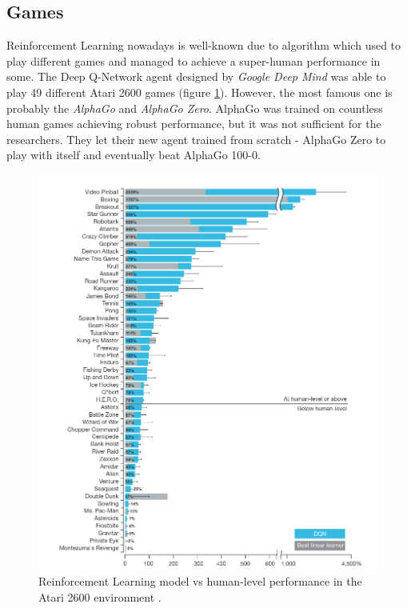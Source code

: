 \subsection{Games}
\label{sub:intro-games}
Reinforcement Learning nowadays is well-known due to algorithm which used to play different games and managed to achieve a super-human performance in some.
The Deep Q-Network agent designed by \emph{Google Deep Mind} was able to play 49 different Atari 2600 games (figure \ref{fig:Atari2600}). However, the most
famous one is probably the \emph{AlphaGo} \cite{AlphaGO}  and \emph{AlphaGo Zero}. AlphaGo was trained on countless human games achieving
robust performance, but it was not sufficient for the researchers. They let their new agent trained from scratch - AlphaGo Zero to play with
itself and eventually beat AlphaGo 100-0. 

\begin{figure}[h]
    \includegraphics[width=12cm]{img/Atari2600.png}
    \centering
    \caption{Reinforcement Learning model vs human-level performance in the Atari 2600 environment \cite{DQNAtari}.}
    \label{fig:Atari2600}
\end{figure}

